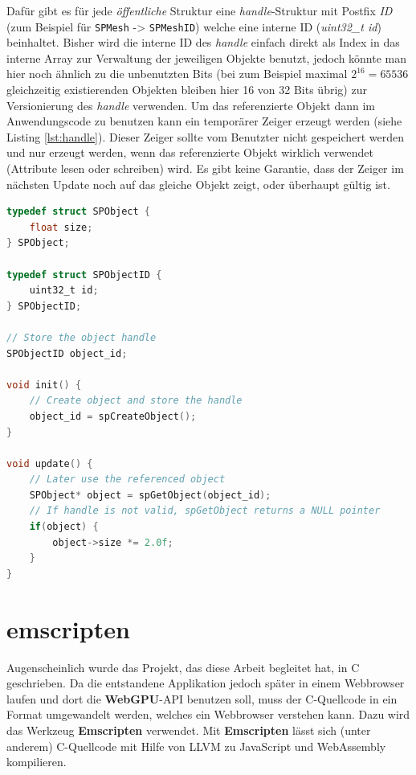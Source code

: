 \documentclass[oneside]{ausarbeitung}
\begin{document}
Dafür gibt es für jede \textit{öffentliche} Struktur eine \textit{handle}-Struktur mit Postfix \textit{ID} (zum Beispiel für \texttt{SPMesh} -> \texttt{SPMeshID}) welche eine interne ID (\textit{uint32\_t id}) beinhaltet. Bisher wird die interne ID des \textit{handle} einfach direkt als Index in das interne Array zur Verwaltung der jeweiligen Objekte benutzt, jedoch könnte man hier noch ähnlich zu \cite{weissflog:handles} die unbenutzten Bits (bei zum Beispiel maximal $2^{16} = 65536$ gleichzeitig existierenden Objekten bleiben hier 16 von 32 Bits übrig) zur Versionierung des \textit{handle} verwenden. Um das referenzierte Objekt dann im Anwendungscode zu benutzen kann ein temporärer Zeiger erzeugt werden (siehe Listing \ref{lst:handle}). Dieser Zeiger sollte vom Benutzter nicht gespeichert werden und nur erzeugt werden, wenn das referenzierte Objekt wirklich verwendet (Attribute lesen oder schreiben) wird. Es gibt keine Garantie, dass der Zeiger im nächsten Update noch auf das gleiche Objekt zeigt, oder überhaupt gültig ist.

\begin{minipage}{\textwidth}
\begin{lstlisting}[language=C, label={lst:handle}, caption={Verwendung von \textit{handles}}]
typedef struct SPObject {
	float size;
} SPObject;

typedef struct SPObjectID {
	uint32_t id;
} SPObjectID;

// Store the object handle
SPObjectID object_id;

void init() {
	// Create object and store the handle
	object_id = spCreateObject();
}

void update() {
	// Later use the referenced object
	SPObject* object = spGetObject(object_id);
	// If handle is not valid, spGetObject returns a NULL pointer
	if(object) {
		object->size *= 2.0f;
	}
}
\end{lstlisting}
\end{minipage}

\section{emscripten \cite{emscripten}}
Augenscheinlich wurde das Projekt, das diese Arbeit begleitet hat, in C geschrieben. Da die entstandene Applikation jedoch später in einem Webbrowser laufen und dort die \textbf{WebGPU}-\ac{API} benutzen soll, muss der C-Quellcode in ein Format umgewandelt werden, welches ein Webbrowser verstehen kann. Dazu wird das Werkzeug \textbf{Emscripten} verwendet. Mit \textbf{Emscripten} lässt sich (unter anderem) C-Quellcode mit Hilfe von LLVM \cite{llvm} zu JavaScript und WebAssembly \cite{wasm} kompilieren.
\end{document}
